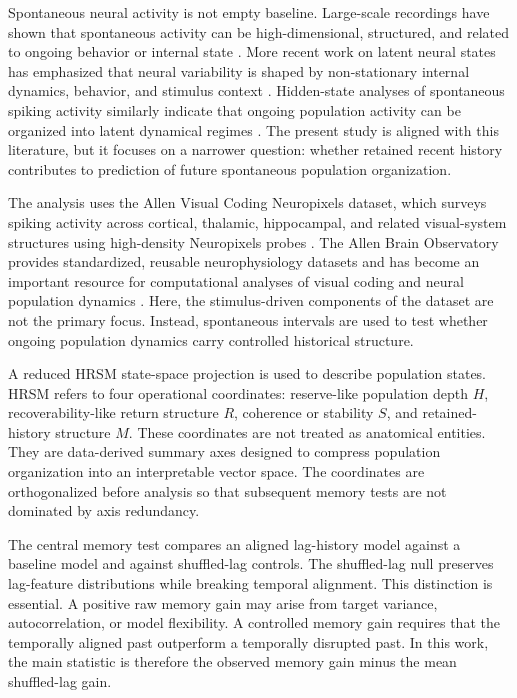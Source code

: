 \documentclass[11pt]{article}
\begin{document}
Spontaneous neural activity is not empty baseline. Large-scale recordings have shown that spontaneous activity can be high-dimensional, structured, and related to ongoing behavior or internal state \citep{Stringer2019Spontaneous}. More recent work on latent neural states has emphasized that neural variability is shaped by non-stationary internal dynamics, behavior, and stimulus context \citep{Akella2025LatentStates}. Hidden-state analyses of spontaneous spiking activity similarly indicate that ongoing population activity can be organized into latent dynamical regimes \citep{Sederberg2024LatentDynamics}. The present study is aligned with this literature, but it focuses on a narrower question: whether retained recent history contributes to prediction of future spontaneous population organization.

The analysis uses the Allen Visual Coding Neuropixels dataset, which surveys spiking activity across cortical, thalamic, hippocampal, and related visual-system structures using high-density Neuropixels probes \citep{Jun2017Neuropixels,Siegle2021VisualHierarchy}. The Allen Brain Observatory provides standardized, reusable neurophysiology datasets and has become an important resource for computational analyses of visual coding and neural population dynamics \citep{DeVries2023AllenLessons,Xie2023VisualCodingAssessment}. Here, the stimulus-driven components of the dataset are not the primary focus. Instead, spontaneous intervals are used to test whether ongoing population dynamics carry controlled historical structure.

A reduced HRSM state-space projection is used to describe population states. HRSM refers to four operational coordinates: reserve-like population depth \(H\), recoverability-like return structure \(R\), coherence or stability \(S\), and retained-history structure \(M\). These coordinates are not treated as anatomical entities. They are data-derived summary axes designed to compress population organization into an interpretable vector space. The coordinates are orthogonalized before analysis so that subsequent memory tests are not dominated by axis redundancy.

The central memory test compares an aligned lag-history model against a baseline model and against shuffled-lag controls. The shuffled-lag null preserves lag-feature distributions while breaking temporal alignment. This distinction is essential. A positive raw memory gain may arise from target variance, autocorrelation, or model flexibility. A controlled memory gain requires that the temporally aligned past outperform a temporally disrupted past. In this work, the main statistic is therefore the observed memory gain minus the mean shuffled-lag gain.
\end{document}
